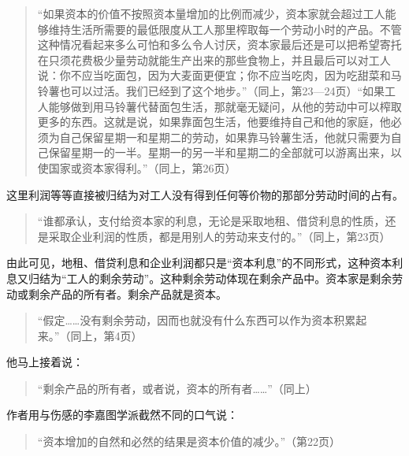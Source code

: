 \begin{quote}{“如果资本的价值不按照资本量增加的比例而减少，资本家就会超过工人能够维持生活所需要的最低限度从工人那里榨取每一个劳动小时的产品。不管这种情况看起来多么可怕和多么令人讨厌，资本家最后还是可以把希望寄托在只须花费极少量劳动就能生产出来的那些食物上，并且最后可以对工人说：你不应当吃面包，因为大麦面更便宜；你不应当吃肉，因为吃甜菜和马铃薯也可以过活。我们已经到了这个地步。”（同上，第23—24页）“如果工人能够做到用马铃薯代替面包生活，那就毫无疑问，从他的劳动中可以榨取更多的东西。这就是说，如果靠面包生活，他要维持自己和他的家庭，他必须为自己保留星期一和星期二的劳动，如果靠马铃薯生活，他就只需要为自己保留星期一的一半。星期一的另一半和星期二的全部就可以游离出来，以使国家或资本家得利。”（同上，第26页）}\end{quote}

这里利润等等直接被归结为对工人没有得到任何等价物的那部分劳动时间的占有。

\begin{quote}{“谁都承认，支付给资本家的利息，无论是采取地租、借贷利息的性质，还是采取企业利润的性质，都是用别人的劳动来支付的。”（同上，第23页）}\end{quote}

由此可见，地租、借贷利息和企业利润都只是“资本利息”的不同形式，这种资本利息又归结为“工人的剩余劳动”。这种剩余劳动体现在剩余产品中。资本家是剩余劳动或剩余产品的所有者。剩余产品就是资本。

\begin{quote}{“假定……没有剩余劳动，因而也就没有什么东西可以作为资本积累起来。”（同上，第4页）}\end{quote}

他马上接着说：

\begin{quote}{“剩余产品的所有者，或者说，资本的所有者……”（同上）}\end{quote}

作者用与伤感的李嘉图学派截然不同的口气说：

\begin{quote}{“资本增加的自然和必然的结果是资本价值的减少。”（第22页）}\end{quote}

